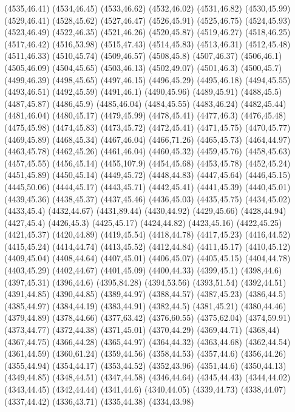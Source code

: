 (4535,46.41)
(4534,46.45)
(4533,46.62)
(4532,46.02)
(4531,46.82)
(4530,45.99)
(4529,46.41)
(4528,45.62)
(4527,46.47)
(4526,45.91)
(4525,46.75)
(4524,45.93)
(4523,46.49)
(4522,46.35)
(4521,46.26)
(4520,45.87)
(4519,46.27)
(4518,46.25)
(4517,46.42)
(4516,53.98)
(4515,47.43)
(4514,45.83)
(4513,46.31)
(4512,45.48)
(4511,46.33)
(4510,45.74)
(4509,46.57)
(4508,45.8)
(4507,46.37)
(4506,46.1)
(4505,46.09)
(4504,45.65)
(4503,46.13)
(4502,49.07)
(4501,46.3)
(4500,45.7)
(4499,46.39)
(4498,45.65)
(4497,46.15)
(4496,45.29)
(4495,46.18)
(4494,45.55)
(4493,46.51)
(4492,45.59)
(4491,46.1)
(4490,45.96)
(4489,45.91)
(4488,45.5)
(4487,45.87)
(4486,45.9)
(4485,46.04)
(4484,45.55)
(4483,46.24)
(4482,45.44)
(4481,46.04)
(4480,45.17)
(4479,45.99)
(4478,45.41)
(4477,46.3)
(4476,45.48)
(4475,45.98)
(4474,45.83)
(4473,45.72)
(4472,45.41)
(4471,45.75)
(4470,45.77)
(4469,45.89)
(4468,45.34)
(4467,46.04)
(4466,71.26)
(4465,45.73)
(4464,44.97)
(4463,45.78)
(4462,45.26)
(4461,46.04)
(4460,45.32)
(4459,45.76)
(4458,45.63)
(4457,45.55)
(4456,45.14)
(4455,107.9)
(4454,45.68)
(4453,45.78)
(4452,45.24)
(4451,45.89)
(4450,45.14)
(4449,45.72)
(4448,44.83)
(4447,45.64)
(4446,45.15)
(4445,50.06)
(4444,45.17)
(4443,45.71)
(4442,45.41)
(4441,45.39)
(4440,45.01)
(4439,45.36)
(4438,45.37)
(4437,45.46)
(4436,45.03)
(4435,45.75)
(4434,45.02)
(4433,45.4)
(4432,44.67)
(4431,89.44)
(4430,44.92)
(4429,45.66)
(4428,44.94)
(4427,45.4)
(4426,45.3)
(4425,45.17)
(4424,44.82)
(4423,45.16)
(4422,45.25)
(4421,45.37)
(4420,44.89)
(4419,45.54)
(4418,44.78)
(4417,45.23)
(4416,44.52)
(4415,45.24)
(4414,44.74)
(4413,45.52)
(4412,44.84)
(4411,45.17)
(4410,45.12)
(4409,45.04)
(4408,44.64)
(4407,45.01)
(4406,45.07)
(4405,45.15)
(4404,44.78)
(4403,45.29)
(4402,44.67)
(4401,45.09)
(4400,44.33)
(4399,45.1)
(4398,44.6)
(4397,45.31)
(4396,44.6)
(4395,84.28)
(4394,53.56)
(4393,51.54)
(4392,44.51)
(4391,44.85)
(4390,44.85)
(4389,44.97)
(4388,44.57)
(4387,45.23)
(4386,44.5)
(4385,44.97)
(4384,44.19)
(4383,44.91)
(4382,44.5)
(4381,45.21)
(4380,44.46)
(4379,44.89)
(4378,44.66)
(4377,63.42)
(4376,60.55)
(4375,62.04)
(4374,59.91)
(4373,44.77)
(4372,44.38)
(4371,45.01)
(4370,44.29)
(4369,44.71)
(4368,44)
(4367,44.75)
(4366,44.28)
(4365,44.97)
(4364,44.32)
(4363,44.68)
(4362,44.54)
(4361,44.59)
(4360,61.24)
(4359,44.56)
(4358,44.53)
(4357,44.6)
(4356,44.26)
(4355,44.94)
(4354,44.17)
(4353,44.52)
(4352,43.96)
(4351,44.6)
(4350,44.13)
(4349,44.85)
(4348,44.51)
(4347,44.58)
(4346,44.64)
(4345,44.43)
(4344,44.02)
(4343,44.45)
(4342,44.44)
(4341,44.6)
(4340,44.05)
(4339,44.73)
(4338,44.07)
(4337,44.42)
(4336,43.71)
(4335,44.38)
(4334,43.98)
